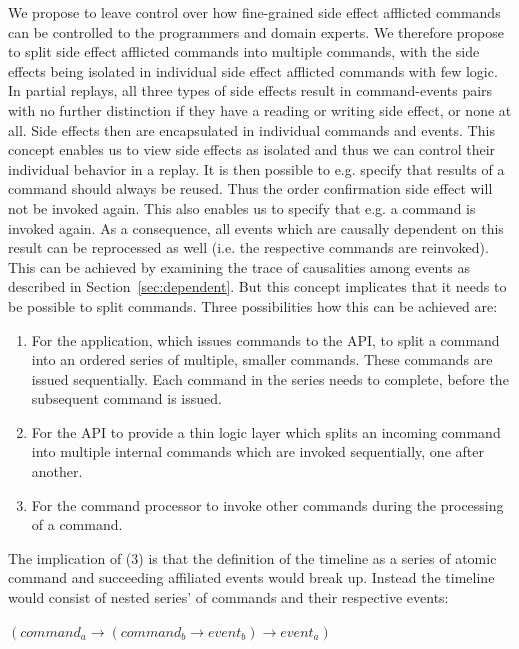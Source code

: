 We propose to leave control over how fine-grained side effect afflicted 
commands can be controlled to the programmers and domain experts. 
We therefore propose to split side effect afflicted commands into multiple 
commands, with the side effects being isolated in individual side effect 
afflicted commands with few logic.
In partial replays, all three types of side effects result in command-events 
pairs with no further distinction if they have a reading or writing side effect, 
or none at all.
Side effects then are encapsulated in individual commands and events. This 
concept enables us to view side effects as isolated and thus we can control
their individual behavior in a replay. It is then possible to e.g. specify 
that results of a command  should always be 
reused. Thus the order confirmation side effect will not be invoked again. 
This also enables us to specify that e.g. a command  
is invoked again. As a consequence, all events which are causally dependent 
on this result can be reprocessed as well (i.e.  the respective commands are 
reinvoked). This can be achieved by examining the trace of causalities among 
events as described in Section~\ref{sec:dependent}.
%
But this concept implicates that it needs to be possible to split commands.
Three possibilities how this can be achieved are:

\begin{enumerate}
\item For the application, which issues commands to the API, to split a 
command into an ordered series of multiple, smaller commands. These commands 
are issued sequentially. Each command in the series needs to complete, before 
the subsequent command is issued.

\item For the API to provide a thin logic layer which splits an incoming 
command into multiple internal commands which are invoked sequentially, 
one after another.

\item For the command processor to invoke other commands during the processing 
of a command.
\end{enumerate}


The implication of (3) is that the definition of the timeline as a series of 
atomic command and succeeding affiliated events would break up. Instead the 
timeline would consist of nested series' of commands and their respective events: 

\begin{center}
$(command_a\rightarrow(command_b\rightarrow{}event_b)\rightarrow{}event_a)$
\end{center}

